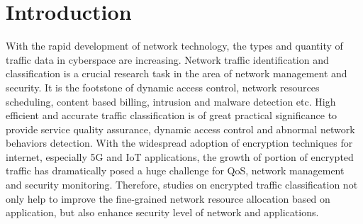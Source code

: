 \documentclass[conference]{IEEEtran}
\begin{document}
\section{Introduction}\label{sec:intro} %
With the rapid development of network technology, the types and quantity of traffic data in cyberspace are increasing. Network traffic identification and classification is a crucial research task in the area of network management and security. It is the footstone of dynamic access control, network resources scheduling, content based billing, intrusion and malware detection etc. High efficient and accurate traffic classification is of great practical significance to provide service quality assurance, dynamic access control and abnormal network behaviors detection. With the widespread adoption of encryption techniques for internet, especially 5G and IoT applications, the growth of portion of encrypted traffic has dramatically posed a huge challenge for QoS, network management and security monitoring. Therefore, studies on encrypted traffic classification not only help to improve the fine-grained network resource allocation based on application, but also enhance security level of network and applications.
\end{document}
